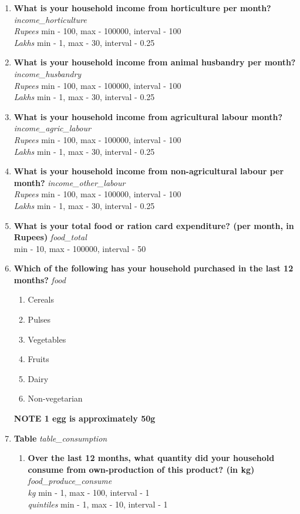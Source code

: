 \documentclass{article}
\begin{document}
\begin{enumerate}
\item {\bfseries What is your household income from horticulture per month?}\emph{ income\_horticulture } 
\\ \emph{ Rupees }min - 100, max - 100000, interval - 100 
\\ \emph{ Lakhs }min - 1, max - 30, interval - 0.25 
 
\item {\bfseries What is your household income from animal husbandry per month?}\emph{ income\_husbandry } 
\\ \emph{ Rupees }min - 100, max - 100000, interval - 100 
\\ \emph{ Lakhs }min - 1, max - 30, interval - 0.25 
 
\item {\bfseries What is your household income from agricultural labour month?}\emph{ income\_agric\_labour } 
\\ \emph{ Rupees }min - 100, max - 100000, interval - 100 
\\ \emph{ Lakhs }min - 1, max - 30, interval - 0.25 
 
\item {\bfseries What is your household income from non-agricultural labour per month?}\emph{ income\_other\_labour } 
\\ \emph{ Rupees }min - 100, max - 100000, interval - 100 
\\ \emph{ Lakhs }min - 1, max - 30, interval - 0.25 
 
\item {\bfseries What is your total food or ration card expenditure? (per month, in Rupees)}\emph{ food\_total } 
\\min - 10, max - 100000, interval - 50 
 
\item {\bfseries Which of the following has your household purchased in the last 12 months?}\emph{ food } 
\begin{enumerate} 
\item Cereals 
\item Pulses 
\item Vegetables 
\item Fruits 
\item Dairy 
\item Non-vegetarian 
\end{enumerate}\textbf{{\footnotesize NOTE} 1 egg is approximately 50g } 
 
\item {\bfseries Table}\emph{ table\_consumption } 
\begin{enumerate}[label*=\arabic*.] 
\item {\bfseries Over the last 12 months, what quantity did your household consume from own-production of this product? (in kg)}\emph{ food\_produce\_consume } 
\\ \emph{ kg }min - 1, max - 100, interval - 1 
\\ \emph{ quintiles }min - 1, max - 10, interval - 1 
 

\end{enumerate}
\end{enumerate}
\end{document}
